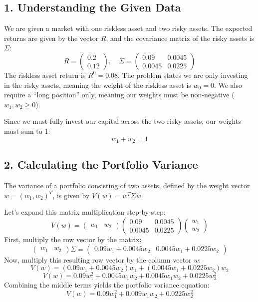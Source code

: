 \subsection*{1. Understanding the Given Data}
We are given a market with one riskless asset and two risky assets. 
The expected returns are given by the vector $R$, and the covariance matrix of the risky assets is $\Sigma$:
\[
R = \begin{pmatrix} 0.2 \\ 0.12 \end{pmatrix}, \quad 
\Sigma = \begin{pmatrix} 0.09 & 0.0045 \\ 0.0045 & 0.0225 \end{pmatrix}
\]
The riskless asset return is $R^0 = 0.08$. The problem states we are only investing in the risky assets, meaning the weight of the riskless asset is $w_0 = 0$. We also require a ``long position'' only, meaning our weights must be non-negative ($w_1, w_2 \ge 0$). 

Since we must fully invest our capital across the two risky assets, our weights must sum to 1:
\[
w_1 + w_2 = 1
\]

\subsection*{2. Calculating the Portfolio Variance}
The variance of a portfolio consisting of two assets, defined by the weight vector $w = (w_1, w_2)^T$, is given by $V(w) = w^T \Sigma w$. 

Let's expand this matrix multiplication step-by-step:
\[
V(w) = \begin{pmatrix} w_1 & w_2 \end{pmatrix} 
\begin{pmatrix} 0.09 & 0.0045 \\ 0.0045 & 0.0225 \end{pmatrix} 
\begin{pmatrix} w_1 \\ w_2 \end{pmatrix}
\]
First, multiply the row vector by the matrix:
\[
\begin{pmatrix} w_1 & w_2 \end{pmatrix} \Sigma = \begin{pmatrix} 0.09w_1 + 0.0045w_2 & 0.0045w_1 + 0.0225w_2 \end{pmatrix}
\]
Now, multiply this resulting row vector by the column vector $w$:
\[
V(w) = (0.09w_1 + 0.0045w_2)w_1 + (0.0045w_1 + 0.0225w_2)w_2
\]
\[
V(w) = 0.09w_1^2 + 0.0045w_1w_2 + 0.0045w_1w_2 + 0.0225w_2^2
\]
Combining the middle terms yields the portfolio variance equation:
\[
V(w) = 0.09w_1^2 + 0.009w_1w_2 + 0.0225w_2^2
\]


